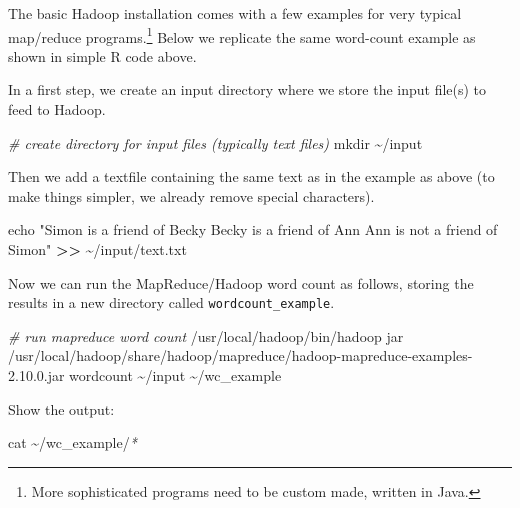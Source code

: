 \documentclass[
  12pt,
]{style/krantz}
\newenvironment{Shaded}{\begin{snugshade}}{\end{snugshade}}
\newcommand{\BuiltInTok}[1]{#1}
\newcommand{\CommentTok}[1]{\textcolor[rgb]{0.56,0.35,0.01}{\textit{#1}}}
\newcommand{\ExtensionTok}[1]{#1}
\newcommand{\FunctionTok}[1]{\textcolor[rgb]{0.00,0.00,0.00}{#1}}
\newcommand{\NormalTok}[1]{#1}
\newcommand{\OperatorTok}[1]{\textcolor[rgb]{0.81,0.36,0.00}{\textbf{#1}}}
\newcommand{\PreprocessorTok}[1]{\textcolor[rgb]{0.56,0.35,0.01}{\textit{#1}}}
\newcommand{\StringTok}[1]{\textcolor[rgb]{0.31,0.60,0.02}{#1}}
\begin{document}
The basic Hadoop installation comes with a few examples for very typical map/reduce programs.\footnote{More sophisticated programs need to be custom made, written in Java.} Below we replicate the same word-count example as shown in simple R code above.

In a first step, we create an input directory where we store the input file(s) to feed to Hadoop.

\begin{Shaded}
\begin{Highlighting}[]
\CommentTok{\# create directory for input files (typically text files)}
\FunctionTok{mkdir}\NormalTok{ \textasciitilde{}/input}
\end{Highlighting}
\end{Shaded}

Then we add a textfile containing the same text as in the example as above (to make things simpler, we already remove special characters).

\begin{Shaded}
\begin{Highlighting}[]
\BuiltInTok{echo} \StringTok{"Simon is a friend of Becky}
\StringTok{Becky is a friend of Ann}
\StringTok{Ann is not a friend of Simon"} \OperatorTok{\textgreater{}\textgreater{}}\NormalTok{  \textasciitilde{}/input/text.txt}
\end{Highlighting}
\end{Shaded}

Now we can run the MapReduce/Hadoop word count as follows, storing the results in a new directory called \texttt{wordcount\_example}.

\begin{Shaded}
\begin{Highlighting}[]
\CommentTok{\# run mapreduce word count}
\ExtensionTok{/usr/local/hadoop/bin/hadoop}\NormalTok{ jar /usr/local/hadoop/share/hadoop/mapreduce/hadoop{-}mapreduce{-}examples{-}2.10.0.jar wordcount \textasciitilde{}/input \textasciitilde{}/wc\_example}
\end{Highlighting}
\end{Shaded}

Show the output:

\begin{Shaded}
\begin{Highlighting}[]
\FunctionTok{cat}\NormalTok{ \textasciitilde{}/wc\_example/}\PreprocessorTok{*}
\end{Highlighting}
\end{Shaded}
\end{document}
